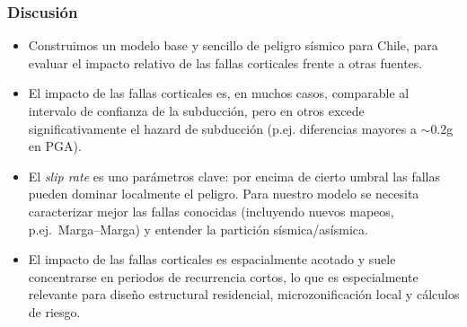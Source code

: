 \documentclass[9pt,ignorenonframetext,mathserif,aspectratio=169,xcolor=dvipsnames]{beamer}
\begin{document}
\begin{frame}[t]\frametitle{Discusión}


\begin{itemize}
  \item Construimos un modelo base y sencillo de peligro sísmico para Chile,
        para evaluar el impacto relativo de las fallas corticales
        frente a otras fuentes.


  \item El impacto de las fallas corticales es, en muchos casos, comparable
        al intervalo de confianza de la subducción, pero en otros excede
        significativamente el hazard de subducción (p.ej. diferencias
        mayores a $\sim 0.2$g en PGA).

  \item El \emph{slip rate} es uno parámetros clave: por
        encima de cierto umbral las fallas pueden dominar localmente el
        peligro. Para nuestro modelo se necesita caracterizar
        mejor las fallas conocidas (incluyendo nuevos mapeos, p.ej.\ Marga--Marga) y entender
        la partición sísmica/asísmica.

  \item El impacto de las fallas corticales es espacialmente acotado y
        suele concentrarse en periodos de recurrencia cortos, lo que es
        especialmente relevante para diseño estructural residencial, microzonificación
        local y cálculos de riesgo.
\end{itemize}

\end{frame}
\end{document}
